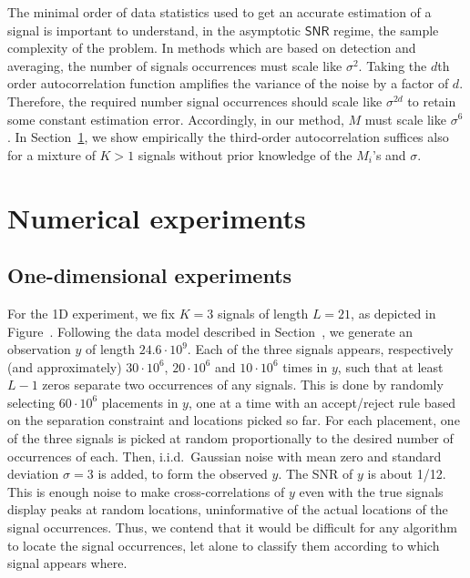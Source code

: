 \documentclass[english,11pt]{article}
\newcommand{\TODO}[1]{{\color{red}{[#1]}}}
\numberwithin{equation}{section}
\theoremstyle{plain}
\theoremstyle{definition}
\theoremstyle{remark}
\theoremstyle{plain}
\theoremstyle{remark}
\theoremstyle{plain}
\theoremstyle{plain}
\newcommand{\SNR}{{\textsf{SNR}}}
\begin{document}
The minimal order of data statistics used to get an accurate estimation of a signal is important to understand, in the asymptotic $\SNR$ regime, the sample complexity of the problem.
In methods which are based on detection and averaging, the number of signals occurrences  must scale like $\sigma^2$. Taking the $d$th order autocorrelation function amplifies the variance of the noise by a factor of $d$. Therefore, the required number signal occurrences should scale like $\sigma^{2d}$  to retain some constant estimation error. Accordingly, in our  method, $M$ must scale like $\sigma^6$. In Section~\ref{sec:numerics}, we show empirically the third-order autocorrelation suffices also for a mixture of $K>1$ signals without prior knowledge of the $M_i$'s and $\sigma$.  \TODO{question mark on the entire paragraph}
\TODO{We could move here the paragraphs from 1D XP about which moments we compute, to argue that we can expect to recover at most up to $K = L/2$ signals.}


\section{Numerical experiments}   \label{sec:numerics}



\subsection{One-dimensional experiments}


For the 1D experiment, we fix $K = 3$ signals of length $L = 21$, as depicted in Figure~\TODO{ref}. Following the data model described in Section~\TODO{ref}, we generate an observation $y$ of length $24.6 \cdot 10^9$. Each of the three signals appears, respectively (and approximately) $30 \cdot 10^6$, $20 \cdot 10^6$ and $10 \cdot 10^6$ times in $y$, such that at least $L-1$ zeros separate two occurrences of any signals. This is done by randomly selecting $60 \cdot 10^6$ placements in $y$, one at a time with an accept/reject rule based on the separation constraint and locations picked so far. For each placement, one of the three signals is picked at random proportionally to the desired number of occurrences of each. Then, i.i.d.\ Gaussian noise with mean zero and standard deviation $\sigma = 3$ is added, to form the observed $y$. The SNR of $y$
is about 1/12.
This is enough noise to make cross-correlations of $y$ even with the true signals display peaks at random locations, uninformative of the actual locations of the signal occurrences. Thus, we contend that it would be difficult for any algorithm to locate the signal occurrences, let alone to classify them according to which signal appears where.
\end{document}
